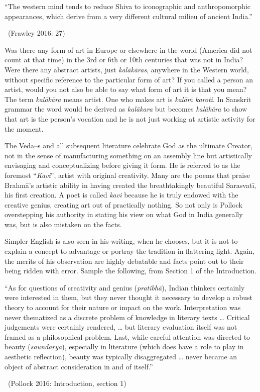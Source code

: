 \begin{myquote}
“The western mind tends to reduce Shiva to iconographic and anthropomorphic appearances, which derive from a very different cultural milieu of ancient India.” 

~\hfill (Frawley 2016: 27)
\end{myquote}

Was there any form of art in Europe or elsewhere in the world (America did not count at that time) in the 3rd or 6th or 10th centuries that was not in India? Were there any abstract artists, just \textit{kalākāras}, anywhere in the Western world, without specific reference to the particular form of art? If you called a person an artist, would you not also be able to say what form of art it is that you mean? The term \textit{kalākāra} means artist. One who makes art is \textit{kalāṁ karoti}. In Sanskrit grammar the word would be derived as \textit{kalākara} but becomes \textit{kalākāra} to show that art is the person’s vocation and he is not just working at artistic activity for the moment.

The Veda–s and all subsequent literature celebrate God as the ultimate Creator, not in the sense of manufacturing something on an assembly line but artistically envisaging and conceptualizing before giving it form. He is referred to as the foremost “\textit{Kavi}”, artist with original creativity. Many are the poems that praise Brahmā’s artistic ability in having created the breathtakingly beautiful Sarasvatī, his first creation. A poet is called \textit{kavi} because he is truly endowed with the creative genius, creating art out of practically nothing. So not only is Pollock overstepping his authority in stating his view on what God in India generally was, but is also mistaken on the facts.

Simpler English is also seen in his writing, when he chooses, but it is not to explain a concept to advantage or portray the tradition in flattering light. Again, the merits of his observation are highly debatable and facts point out to their being ridden with error. Sample the following, from Section 1 of the Introduction.

\begin{myquote}
“As for questions of creativity and genius (\textit{pratibhā}), Indian thinkers certainly were interested in them, but they never thought it necessary to develop a robust theory to account for their nature or impact on the work. Interpretation was never thematized as a discrete problem of knowledge in literary texts … Critical judgements were certainly rendered, … but literary evaluation itself was not framed as a philosophical problem. Last, while careful attention was directed to beauty (\textit{saundarya}), especially in literature (which does have a role to play in aesthetic reflection), beauty was typically disaggregated … never became an object of abstract consideration in and of itself.” 

~\hfill (Pollock 2016: Introduction, section 1)
\end{myquote}

